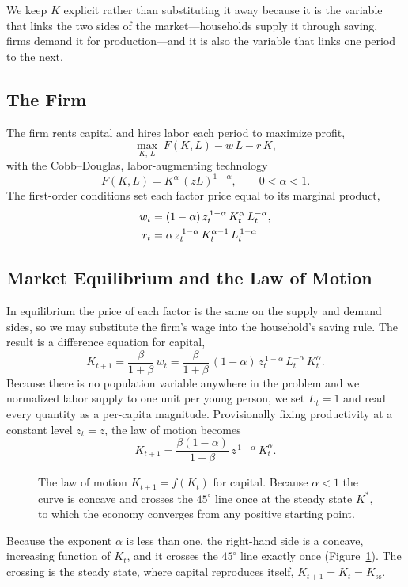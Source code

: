 We keep $K$ explicit rather than substituting it away because it is the variable that links the two sides of the market---households supply it through saving, firms demand it for production---and it is also the variable that links one period to the next.

\subsection{The Firm}

The firm rents capital and hires labor each period to maximize profit,
\[
\max_{K,\,L}\; F(K, L) - w\,L - r\,K,
\]
with the Cobb--Douglas, labor-augmenting technology
\[
F(K, L) = K^{\alpha}\,(zL)^{1-\alpha}, \qquad 0 < \alpha < 1.
\]
The first-order conditions set each factor price equal to its marginal product,
\[
\begin{aligned}
w_t &= (1-\alpha)\,z_t^{\,1-\alpha}\, K_t^{\alpha}\, L_t^{-\alpha}, \\
r_t &= \alpha\,z_t^{\,1-\alpha}\, K_t^{\alpha-1}\, L_t^{\,1-\alpha}.
\end{aligned}
\]

\subsection{Market Equilibrium and the Law of Motion}

In equilibrium the price of each factor is the same on the supply and demand sides, so we may substitute the firm's wage into the household's saving rule. The result is a difference equation for capital,
\[
K_{t+1} = \frac{\beta}{1+\beta}\, w_t = \frac{\beta}{1+\beta}\,(1-\alpha)\,z_t^{\,1-\alpha}\, L_t^{-\alpha}\, K_t^{\alpha}.
\]
Because there is no population variable anywhere in the problem and we normalized labor supply to one unit per young person, we set $L_t = 1$ and read every quantity as a per-capita magnitude. Provisionally fixing productivity at a constant level $z_t = z$, the law of motion becomes
\[
K_{t+1} = \frac{\beta(1-\alpha)}{1+\beta}\, z^{\,1-\alpha}\, K_t^{\alpha}.
\]

\begin{figure}[h]
\centering

\caption{The law of motion $K_{t+1}=f(K_t)$ for capital. Because $\alpha<1$ the curve is concave and crosses the $45^\circ$ line once at the steady state $K^{*}$, to which the economy converges from any positive starting point.}
\label{fig:macro-6}
\end{figure}

Because the exponent $\alpha$ is less than one, the right-hand side is a concave, increasing function of $K_t$, and it crosses the $45^\circ$ line exactly once (Figure~\ref{fig:macro-6}). The crossing is the steady state, where capital reproduces itself, $K_{t+1} = K_t = K_{\mathrm{ss}}$.

